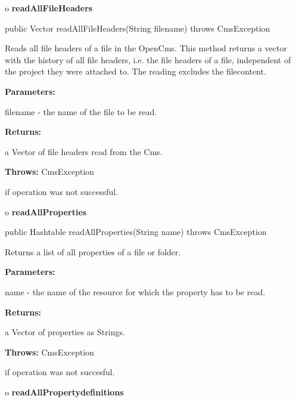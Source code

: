 o {\bf readAllFileHeaders} 

\begin{PRE}
 public Vector readAllFileHeaders(String filename) throws CmsException
\end{PRE}

\begin{description}
\htmlDD Reads all file headers of a file in the OpenCms. \htmlBR
This method returns a vector with the history of all file headers, i.e. the
file headers of a file, independent of the project they were attached
to.\htmlBR
The reading excludes the filecontent. 

\begin{description}
\item {\bf Parameters:}  

filename - the name of the file to be read.  
\item {\bf Returns:}  

a Vector of file headers read from the Cms.  
\item {\bf Throws:} CmsException  

if operation was not successful.  
\end{description}

\end{description}

o {\bf readAllProperties} 

\begin{PRE}
 public Hashtable readAllProperties(String name) throws CmsException
\end{PRE}

\begin{description}
\htmlDD Returns a list of all properties of a file or folder. 

\begin{description}
\item {\bf Parameters:}  

name - the name of the resource for which the property has to be read.  
\item {\bf Returns:}  

a Vector of properties as Strings.  
\item {\bf Throws:} CmsException  

if operation was not succesful.  
\end{description}

\end{description}

o {\bf readAllPropertydefinitions} 

